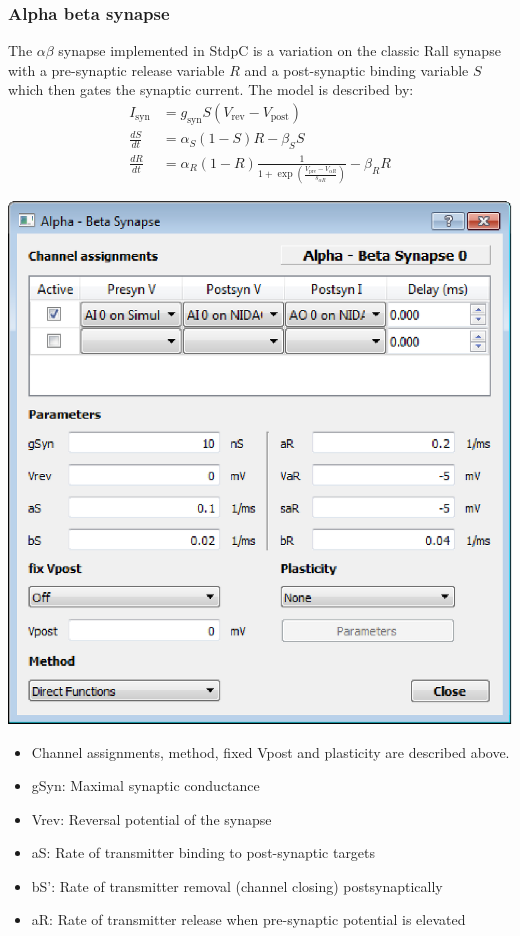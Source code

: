 \documentclass{article}
\begin{document}
\subsubsection{Alpha beta synapse}
The $\alpha\beta$ synapse implemented in StdpC is a variation on the
classic Rall synapse \cite{Rall1967} with a pre-synaptic release variable $R$ and a
post-synaptic binding variable $S$ which then gates the synaptic
current. The model is described by:
\begin{align}
I_{\text{syn}}&= g_{\text{syn}} S (V_{\text{rev}} -
V_{\text{post}}) \\
 \frac{dS}{dt} &= \alpha_S (1-S)R - \beta_S S  \\
 \frac{dR}{dt} &= \alpha_R (1-R) \frac{1}{1+
   \exp (\frac{V_{\text{pre}}-V_{\alpha R}}{s_{\alpha R}})} -
 \beta_R R  
\end{align}
\parbox[b]{0.48\textwidth}{
\includegraphics[scale=0.5]{abSynDialog}\\}
\hfill
\parbox[b]{0.5\textwidth}{
\begin{itemize}
\item Channel assignments, method, fixed Vpost and plasticity are described above.
\item gSyn: Maximal synaptic conductance
\item Vrev: Reversal potential of the synapse
\item aS: Rate of transmitter binding to post-synaptic targets
\item bS': Rate of transmitter removal (channel closing)
  postsynaptically
\item aR: Rate of transmitter release when pre-synaptic potential is
  elevated
\end{itemize}
}
\end{document}

